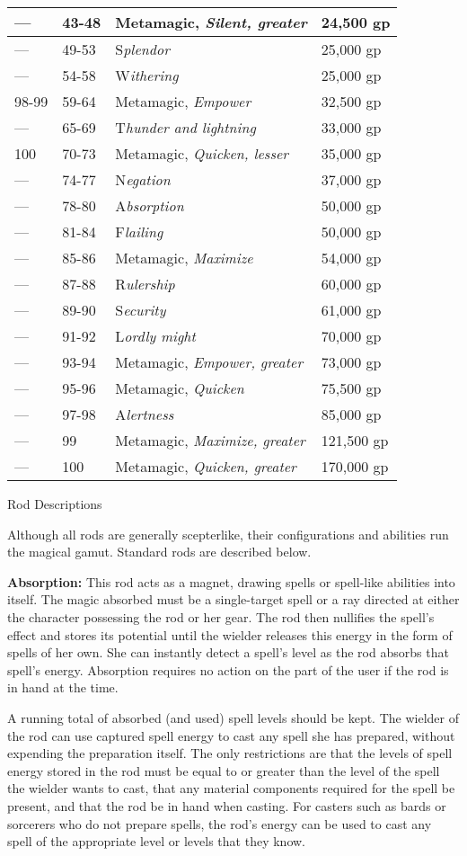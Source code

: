 \documentclass{article}
\begin{document}
\begin{tabular}{|>{\raggedright}p{40pt}|>{\raggedright}p{31pt}|>{\raggedright}p{127pt}|>{\raggedright}p{60pt}|}
\hline
--- & 43-48 & Metamagic, \textit{Silent, greater} & 24,500 gp\tabularnewline
\hline
--- & 49-53 & S\textit{plendor} & 25,000 gp\tabularnewline
\hline
--- & 54-58 & W\textit{ithering} & 25,000 gp\tabularnewline
\hline
98-99 & 59-64 & Metamagic, \textit{Empower} & 32,500 gp\tabularnewline
\hline
--- & 65-69 & T\textit{hunder and lightning} & 33,000 gp\tabularnewline
\hline
100 & 70-73 & Metamagic, \textit{Quicken, lesser} & 35,000 gp\tabularnewline
\hline
--- & 74-77 & N\textit{egation} & 37,000 gp\tabularnewline
\hline
--- & 78-80 & A\textit{bsorption} & 50,000 gp\tabularnewline
\hline
--- & 81-84 & F\textit{lailing} & 50,000 gp\tabularnewline
\hline
--- & 85-86 & Metamagic, \textit{Maximize} & 54,000 gp\tabularnewline
\hline
--- & 87-88 & R\textit{ulership} & 60,000 gp\tabularnewline
\hline
--- & 89-90 & S\textit{ecurity} & 61,000 gp\tabularnewline
\hline
--- & 91-92 & L\textit{ordly might} & 70,000 gp\tabularnewline
\hline
--- & 93-94 & Metamagic, \textit{Empower, greater} & 73,000 gp\tabularnewline
\hline
--- & 95-96 & Metamagic, \textit{Quicken} & 75,500 gp\tabularnewline
\hline
--- & 97-98 & A\textit{lertness} & 85,000 gp\tabularnewline
\hline
--- & 99 & Metamagic, \textit{Maximize, greater} & 121,500 gp\tabularnewline
\hline
--- & 100 & Metamagic, \textit{Quicken, greater} & 170,000 gp\tabularnewline
\hline
\end{tabular}

\vspace{12pt}
Rod Descriptions

Although all rods are generally scepterlike, their configurations and abilities 
run the magical gamut. Standard rods are described below.

\textbf{Absorption:} This rod acts as a magnet, drawing spells or spell-like abilities 
into itself. The magic absorbed must be a single-target spell or a ray directed 
at either the character possessing the rod or her gear. The rod then nullifies 
the spell's effect and stores its potential until the wielder releases this energy 
in the form of spells of her own. She can instantly detect a spell's level as the 
rod absorbs that spell's energy. Absorption requires no action on the part of the 
user if the rod is in hand at the time.

A running total of absorbed (and used) spell levels should be kept. The wielder 
of the rod can use captured spell energy to cast any spell she has prepared, without 
expending the preparation itself. The only restrictions are that the levels of 
spell energy stored in the rod must be equal to or greater than the level of the 
spell the wielder wants to cast, that any material components required for the 
spell be present, and that the rod be in hand when casting. For casters such as 
bards or sorcerers who do not prepare spells, the rod's energy can be used to cast 
any spell of the appropriate level or levels that they know.
\end{document}
